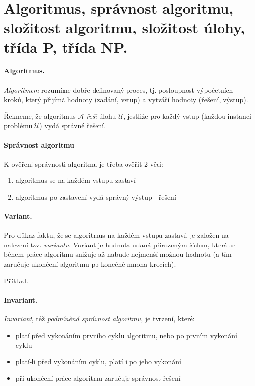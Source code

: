 \section[TAL - Algoritmus, P, NP]{Algoritmus, správnost algoritmu, složitost algoritmu, složitost úlohy, třída P, třída NP.}

\paragraph{Algoritmus.}
\label{algoritmus}
\textit{Algoritmem} rozumíme dobře definovaný proces, tj. posloupnost výpočetních kroků, který přijímá hodnoty (zadání, vstup) a vytváří hodnoty (řešení, výstup).

Řekneme, že algoritmus $\mathcal{A}$ \textit{řeší}  úlohu $\mathcal{U}$, jestliže pro každý vstup (každou instanci problému $\mathcal{U}$) vydá správné řešení.

\paragraph{Správnost algoritmu}
K ověření správnosti algoritmu je třeba ověřit 2 věci:
\begin{enumerate}[itemsep=0pt]
    \item algoritmus se na každém vstupu zastaví
    \item algoritmus po zastavení vydá správný výstup - řešení
\end{enumerate}

\paragraph{Variant.}
Pro důkaz faktu, že se algoritmus na každém vstupu zastaví, je založen na nalezení tzv. \textit{variantu}. Variant je hodnota udaná přirozeným číslem, která se během práce algoritmu snižuje až nabude nejmenší možnou hodnotu (a tím zaručuje ukončení algoritmu po konečně mnoha krocích).

Příklad:

\paragraph{Invariant.}
\textit{Invariant}, též \textit{podmíněná správnost algoritmu}, je tvrzení, které:
\begin{itemize}[itemsep=0pt]
    \item platí před vykonáním prvního cyklu algoritmu, nebo po prvním vykonání cyklu
    \item platí-li před vykonáním cyklu, platí i po jeho vykonání
    \item při ukončení práce algoritmu zaručuje správnost řešení
\end{itemize}

